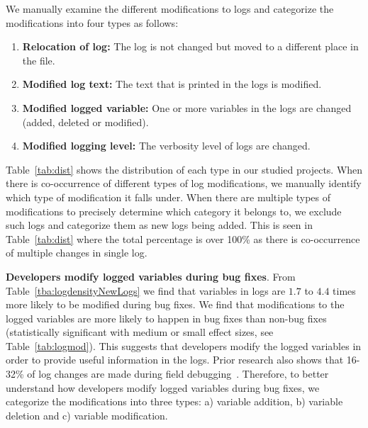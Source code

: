 We manually examine the different modifications to logs and categorize the modifications into four types as follows:
\begin{enumerate}
	\item \textbf{Relocation of log:} The log is not changed but moved to a different place in the file.
	\item \textbf{Modified log text:} The text that is printed in the logs is modified.
	\item \textbf{Modified logged variable:} One or more variables in the logs are changed (added, deleted or modified).
	\item \textbf{Modified logging level:} The verbosity level of logs are changed.
\end{enumerate}
Table~\ref{tab:dist} shows the distribution of each type in our studied projects. When there is co-occurrence of different types of log modifications, we manually identify which type of modification it falls under. When there are multiple types of modifications to precisely determine which category it belongs to, we exclude such logs and categorize them as new logs being added. This is seen in Table~\ref{tab:dist} where the total percentage is over 100\% as there is co-occurrence of multiple changes in single log. 


\textbf{Developers modify logged variables during bug fixes}. From Table~\ref{tba:logdensityNewLogs} we find that variables in logs are $1.7$ to $4.4$ times more likely to be modified during bug fixes. We find that modifications to the logged variables are more likely to happen in bug fixes than non-bug fixes (statistically significant with medium or small effect sizes, see Table~\ref{tab:logmod}). This suggests that developers modify the logged variables in order to provide useful information in the logs. Prior research also shows that 16-32\% of log changes are made during field debugging~\cite{EMSEIAN}. Therefore, to better understand how developers modify logged variables during bug fixes, we categorize the modifications into three types: a) variable addition, b) variable deletion and c) variable modification.

